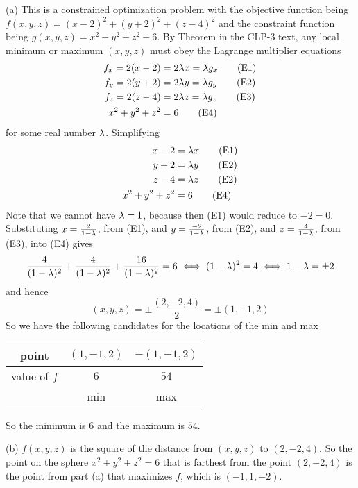 \begin{solution}
(a)
This is a constrained optimization problem with the objective function being
$f(x,y,z) = (x - 2)^2 + (y + 2)^2 + (z - 4)^2$ and the constraint function 
being $g(x,y,z) =x^2 + y^2 + z^2 - 6$.
By Theorem  in the CLP-3 text, any local minimum
or maximum $(x,y,z)$ must obey the  Lagrange multiplier equations
\begin{align*}
f_x = 2(x-2) &=2 \lambda x = \lambda g_x \tag{E1} \\ 
f_y = 2(y+2) &=2 \lambda y = \lambda g_y \tag{E2} \\ 
f_z = 2(z-4) &=2 \lambda z = \lambda g_z \tag{E3} \\ 
x^2 + y^2 + z^2 &= 6 \tag{E4}
\end{align*}
for some real number $\lambda$.
Simplifying
\begin{align*}
x-2 &= \lambda x  \tag{E1} \\ 
y+2 &= \lambda y \tag{E2} \\ 
z-4 &= \lambda z \tag{E2} \\
x^2 + y^2 + z^2 &= 6 \tag{E4}
\end{align*}
Note that we cannot have $\lambda=1$, because then (E1) would reduce to $-2=0$.
Substituting 
  $x=\frac{2}{1-\lambda}$, from (E1), and
  $y=\frac{-2}{1-\lambda}$, from (E2), and
  $z=\frac{4}{1-\lambda}$, from (E3), 
into (E4) gives
\begin{align*}
\frac{4}{(1-\lambda)^2} + \frac{4}{(1-\lambda)^2} + \frac{16}{(1-\lambda)^2} =6
\iff (1-\lambda)^2=4
\iff 1-\lambda =\pm 2
\end{align*}
and hence
\begin{equation*}
(x,y,z) = \pm \frac{(2,-2,4)}{2}= \pm (1,-1,2)
\end{equation*}
So we have the following candidates for the locations of the min and max
\begin{center}
\renewcommand{\arraystretch}{1.3}
     \begin{tabular}{|c|c|c|}
     \hline
       point
       &$(1,-1,2)$
       &$-(1,-1,2)$ \\ \hline
       value of $f$
       &$6$
       &$54$ \\ \hline
       &min 
       &max \\ \hline
     \end{tabular}
\renewcommand{\arraystretch}{1.0}
\end{center}
So the minimum is $6$ and the maximum is $54$.

(b) $f(x,y,z)$ is the square of the distance from $(x,y,z)$ to $(2,-2,4)$.
So the point on the sphere $x^2 + y^2 + z^2 = 6$ that is farthest 
from the point $(2, -2, 4)$ is the point from part (a) that maximizes $f$,
which is $(-1,1,-2)$.
\end{solution}

